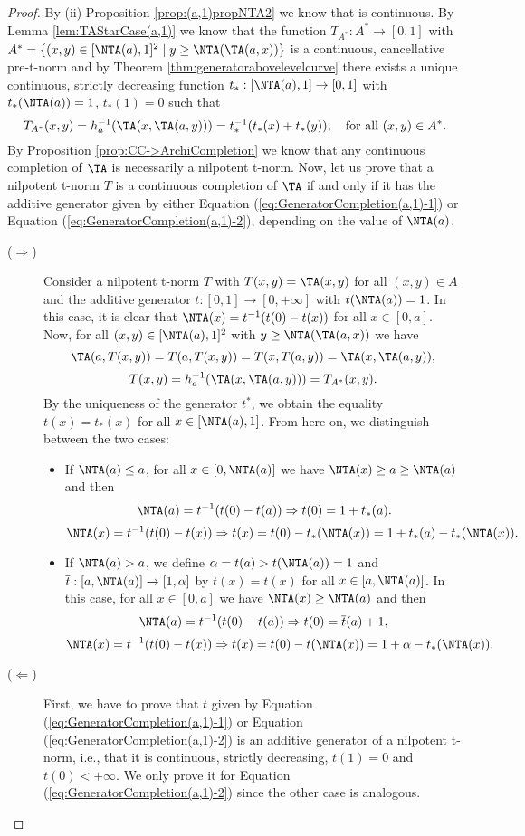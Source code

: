 \begin{proof}
	By (ii)-Proposition \ref{prop:(a,1)propNTA2} we know that \NTA is continuous. By Lemma \ref{lem:TAStarCase(a,1)} we know that the function $T_{A^*}: A^* \to [0,1]$ with $A^* = \{(x,y) \in [\NTA(a),1]^2 \mid y \geq \NTA(\TA(a,x))\}$ is a continuous, cancellative pre-t-norm and by Theorem \ref{thm:generatorabovelevelcurve} there exists a unique continuous, strictly decreasing function $t_{*} : [\NTA(a),1] \to [0,1]$ with $t_*(\NTA(a))=1$, $t_*(1)=0$ such that
	$$T_{A^*}(x,y)=h_a^{-1}(\TA(x,\TA(a,y))) = t_*^{-1}(t_*(x)+t_*(y)), \quad \text{for all } (x,y) \in A^*.$$
	By Proposition \ref{prop:CC->ArchiCompletion} we know that any continuous completion of $\TA$ is necessarily a nilpotent t-norm. Now, let us prove that a nilpotent t-norm $T$ is a continuous completion of $\TA$ if and only if it has the additive generator given by either Equation (\ref{eq:GeneratorCompletion(a,1)-1}) or Equation (\ref{eq:GeneratorCompletion(a,1)-2}), depending on the value of $\NTA(a)$.
	\begin{description}
		\item[($\Rightarrow$)] Consider a nilpotent t-norm $T$ with $T(x,y)=\TA(x,y)$ for all $(x,y) \in A$ and the additive generator $t:[0,1] \to [0,+\infty]$ with $t(\NTA(a))=1$. In this case, it is clear that $\NTA(x)=t^{-1}(t(0)-t(x))$ for all $x \in [0,a]$. Now,  for all $(x,y) \in [\NTA(a),1]^2$ with $y \geq \NTA(\TA(a,x))$ we have
		$$\TA(a,T(x,y))= T(a,T(x,y))=T(x,T(a,y))=\TA(x,\TA(a,y)),$$
		$$ T(x,y)=h_a^{-1}(\TA(x,\TA(a,y))) = T_{A^*}(x,y).$$
		By the uniqueness of the generator $t^*$, we obtain the equality $t(x)=t_*(x)$ for all $x \in [\NTA(a),1]$. From here on, we distinguish between the two cases:
		\begin{itemize}
			\item If $\NTA(a) \leq a$, for all $x \in [0,\NTA(a)]$ we have $\NTA(x) \geq a \geq \NTA(a)$ and then
			$$\NTA(a)=t^{-1}(t(0)-t(a)) \Rightarrow t(0)=1+t_*(a).$$
			$$\NTA(x)=t^{-1}(t(0)-t(x)) \Rightarrow t(x)=t(0)-t_*(\NTA(x))= 1+t_*(a)-t_*(\NTA(x)).$$
			\item If $\NTA(a)>a$, we define $\alpha=t(a) > t(\NTA(a))=1$ and $\overline{t}:[a,\NTA(a)] \to [1,\alpha]$ by $\overline{t}(x)=t(x)$ for all $x\in [a,\NTA(a)]$. In this case, for all $x \in [0,a]$ we have $\NTA(x) \geq \NTA(a)$ and then
			$$\NTA(a)=t^{-1}(t(0)-t(a)) \Rightarrow t(0)=\overline{t}(a)+1,$$
			$$\NTA(x)=t^{-1}(t(0)-t(x)) \Rightarrow t(x)=t(0)-t(\NTA(x))=1+\alpha -t_*(\NTA(x)).$$
		\end{itemize}
		\item[($\Leftarrow$)]  First, we have to prove that $t$ given by Equation (\ref{eq:GeneratorCompletion(a,1)-1}) or Equation (\ref{eq:GeneratorCompletion(a,1)-2}) is an additive generator of a nilpotent t-norm, i.e., that it is continuous, strictly decreasing, $t(1)=0$ and $t(0)<+\infty$. We only prove it for Equation (\ref{eq:GeneratorCompletion(a,1)-2}) since the other case is analogous.

\end{description}
\end{proof}
